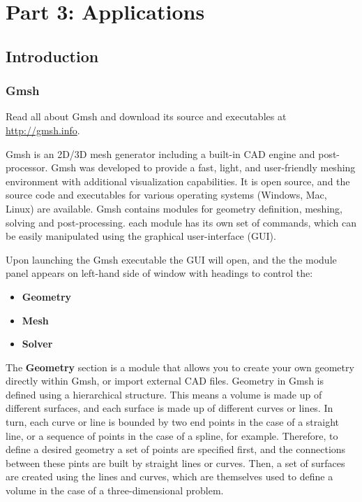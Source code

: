 \part{Part 3: Applications}

\graphicspath{ {./Pictures/} }

\chapter{Introduction}
\label{ch:intro for tutorials}
\section{Gmsh}
\begin{gmshnote}
	Read all about Gmsh and download its source and executables at \href{http://gmsh.info}{http://gmsh.info}.
\end{gmshnote}
Gmsh is an 2D/3D mesh generator including a built-in CAD engine and post-processor. Gmsh was developed to provide a fast, light, and user-friendly meshing environment with additional visualization capabilities. It is open source, and the source code and executables for various operating systems (Windows, Mac, Linux) are available. Gmsh contains modules for geometry definition, meshing, solving and post-processing. each module has its own set of commands, which can be easily manipulated using the graphical user-interface (GUI).

Upon launching the Gmsh executable the GUI will open, and the the module panel appears on left-hand side of window with headings to control the:
\begin{itemize}
    \item \textbf{Geometry}
    \item \textbf{Mesh}
    \item \textbf{Solver}
\end{itemize}
The \textbf{Geometry} section is a module that allows you to create your own geometry directly within Gmsh, or import external CAD files. Geometry in Gmsh is defined using a hierarchical structure. This means a volume is made up of different surfaces, and each surface is made up of different curves or lines. In turn, each curve or line is bounded by two end points in the case of a straight line, or a sequence of points in the case of a spline, for example. Therefore, to define a desired geometry a set of points are specified first, and the connections between these pints are built by straight lines or curves. Then, a set of surfaces are created using the lines and curves, which are themselves used to define a volume in the case of a three-dimensional problem.

